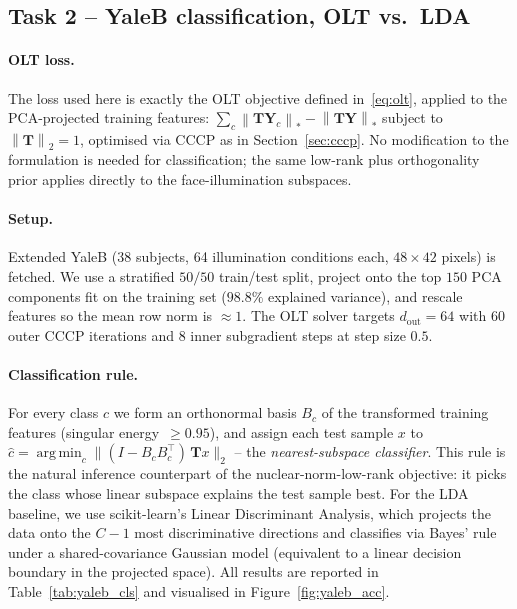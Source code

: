\documentclass[10pt]{article}
\newcommand{\T}{\mathbf{T}}
\newcommand{\Y}{\mathbf{Y}}
\DeclareMathOperator*{\argmin}{arg\,min}
\newcommand{\nuc}[1]{\left\|#1\right\|_{\ast}}
\newcommand{\spn}[1]{\left\|#1\right\|_{2}}
\begin{document}
\subsection{Task 2 -- YaleB classification, OLT vs.\ LDA}

\paragraph{OLT loss.} The loss used here is exactly the OLT objective
defined in~\eqref{eq:olt}, applied to the PCA-projected training
features: $\sum_c \nuc{\T\Y_c} - \nuc{\T\Y}$ subject to
$\spn{\T}=1$, optimised via CCCP as in Section~\ref{sec:cccp}. No
modification to the formulation is needed for classification; the
same low-rank plus orthogonality prior applies directly to the
face-illumination subspaces.

\paragraph{Setup.} Extended YaleB (38 subjects, 64 illumination
conditions each, $48\times 42$ pixels) is fetched. We use a stratified $50/50$
train/test split, project onto the top $150$ PCA components fit on the
training set ($98.8\%$ explained variance), and rescale features so the
mean row norm is $\approx 1$. The OLT solver targets $d_{\text{out}}=64$
with $60$ outer CCCP iterations and $8$ inner subgradient steps at
step size $0.5$.

\paragraph{Classification rule.} For every class $c$ we form an
orthonormal basis $B_c$ of the transformed training features (singular
energy~$\ge 0.95$), and assign each test sample $x$ to
$\hat{c}=\argmin_c \|(I-B_cB_c^{\top})\,\T x\|_2$ -- the
\emph{nearest-subspace classifier}. This rule is the natural inference
counterpart of the nuclear-norm-low-rank objective: it picks the class
whose linear subspace explains the test sample best.
For the LDA baseline, we use scikit-learn's Linear Discriminant Analysis,
which projects the data onto the $C\!-\!1$ most discriminative directions
and classifies via Bayes' rule under a shared-covariance Gaussian model
(equivalent to a linear decision boundary in the projected space).
All results are reported in Table~\ref{tab:yaleb_cls} and visualised in
Figure~\ref{fig:yaleb_acc}.
\end{document}
